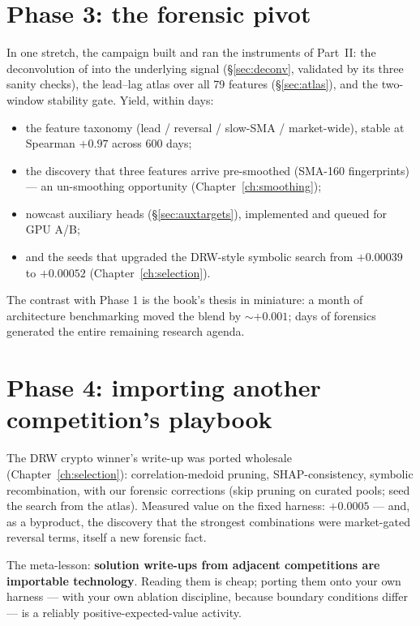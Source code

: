\section{Phase 3: the forensic pivot}

In one stretch, the campaign built and ran the instruments of Part~II:
the deconvolution of  into the underlying signal
(\S\ref{sec:deconv}, validated by its three sanity checks), the lead--lag
atlas over all 79 features (\S\ref{sec:atlas}), and the two-window
stability gate. Yield, within days:

\begin{itemize}
\item the feature taxonomy (lead / reversal / slow-SMA / market-wide),
  stable at Spearman $+0.97$ across 600 days;
\item the discovery that three features arrive pre-smoothed (SMA-160
  fingerprints) --- an un-smoothing opportunity
  (Chapter~\ref{ch:smoothing});
\item nowcast auxiliary heads (\S\ref{sec:auxtargets}), implemented and
  queued for GPU A/B;
\item and the seeds that upgraded the DRW-style symbolic search from
  $+0.00039$ to $+0.00052$ (Chapter~\ref{ch:selection}).
\end{itemize}

The contrast with Phase 1 is the book's thesis in miniature: a month of
architecture benchmarking moved the blend by $\sim +0.001$; days of
forensics generated the entire remaining research agenda.

\section{Phase 4: importing another competition's playbook}

The DRW crypto winner's write-up was ported wholesale
(Chapter~\ref{ch:selection}): correlation-medoid pruning,
SHAP-consistency, symbolic recombination, with our forensic corrections
(skip pruning on curated pools; seed the search from the atlas). Measured
value on the fixed harness: $+0.0005$ --- and, as a byproduct, the
discovery that the strongest combinations were market-gated reversal
terms, itself a new forensic fact.

The meta-lesson: \textbf{solution write-ups from adjacent competitions
are importable technology}. Reading them is cheap; porting them onto your
own harness --- with your own ablation discipline, because boundary
conditions differ --- is a reliably positive-expected-value activity.

